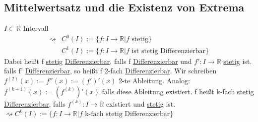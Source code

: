 \documentclass[12pt,a4paper]{article} %
\begin{document}
	\subsection{Mittelwertsatz und die Existenz von Extrema}
	$I \subset \mathbb{R}$ Intervall 
	\begin{align*}
	\rightsquigarrow & C^0(I) := \{f: I \rightarrow \mathbb{R} | f \text{ stetig}\} \\
	& C^1(I) := \{f: I \rightarrow \mathbb{R} | f \text{ ist stetig Differenzierbar}\}
	\end{align*}
	Dabei heißt f \hyperref[def:Stetig]{stetig} \hyperref[def:Differenzierbar]{Differenzierbar}, falls f \hyperref[def:Differenzierbar]{Differenzierbar} und $f': I \rightarrow \mathbb{R}$ \hyperref[def:Stetig]{stetig} ist. \newline
	falls f' \hyperref[def:Differenzierbar]{Differenzierbar}, so heißt f 2-fach \hyperref[def:Differenzierbar]{Differenzierbar}. \newline
	Wir schreiben $f^{(2)}(x) := f''(x) := (f')'(x)$ 2-te Ableitung. \newline
	Analog: $f^{(k + 1)}(x) := (f^{(k)})'(x)$ falls diese Ableitung existiert. \newline
	f heißt k-fach \hyperref[def:Stetig]{stetig} \hyperref[def:Differenzierbar]{Differenzierbar}, falls $f^{(k)}: I \rightarrow \mathbb{R}$ existiert und \hyperref[def:Stetig]{stetig} ist. \newline
	$\rightsquigarrow C^k(I) := \{f: I \rightarrow \mathbb{R} | f \text{ k-fach stetig Differenzierbar}\}$
\end{document}
